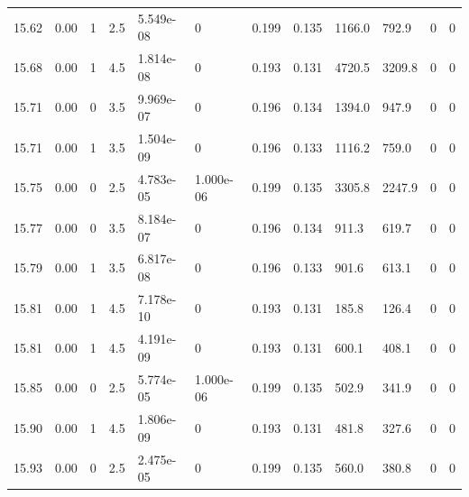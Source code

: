 \documentclass[preview]{standalone}
\begin{document}
{{{{{{{{{{{{{{{{\begin{tabular}{L{1.2cm}C{1.2cm} C{0.3cm}C{0.5cm} C{1.4cm}C{1.4cm} C{1.4cm}C{1.4cm} C{1.6cm}C{1.6cm} C{1.6cm}C{1.6cm}}
  15.62  &  0.00  & 1     & 2.5 &  5.549e-08  & 0  &  0.199&   0.135& 1166.0 & 792.9   &  0 & 0  \\ 
  15.68  &  0.00  & 1     & 4.5 &  1.814e-08  & 0  &  0.193&   0.131& 4720.5 & 3209.8   &  0 & 0  \\ 
  15.71  &  0.00  & 0     & 3.5 &  9.969e-07  & 0  &  0.196&   0.134& 1394.0 & 947.9   &  0 & 0  \\ 
  15.71  &  0.00  & 1     & 3.5 &  1.504e-09  & 0  &  0.196&   0.133& 1116.2 & 759.0   &  0 & 0  \\ 
  15.75  &  0.00  & 0     & 2.5 &  4.783e-05  & 1.000e-06  &  0.199&   0.135& 3305.8 & 2247.9   &  0 & 0  \\ 
  15.77  &  0.00  & 0     & 3.5 &  8.184e-07  & 0  &  0.196&   0.134& 911.3 & 619.7   &  0 & 0  \\ 
  15.79  &  0.00  & 1     & 3.5 &  6.817e-08  & 0  &  0.196&   0.133& 901.6 & 613.1   &  0 & 0  \\ 
  15.81  &  0.00  & 1     & 4.5 &  7.178e-10  & 0  &  0.193&   0.131& 185.8 & 126.4   &  0 & 0  \\ 
  15.81  &  0.00  & 1     & 4.5 &  4.191e-09  & 0  &  0.193&   0.131& 600.1 & 408.1   &  0 & 0  \\ 
  15.85  &  0.00  & 0     & 2.5 &  5.774e-05  & 1.000e-06  &  0.199&   0.135& 502.9 & 341.9   &  0 & 0  \\ 
  15.90  &  0.00  & 1     & 4.5 &  1.806e-09  & 0  &  0.193&   0.131& 481.8 & 327.6   &  0 & 0  \\ 
  15.93  &  0.00  & 0     & 2.5 &  2.475e-05  & 0  &  0.199&   0.135& 560.0 & 380.8   &  0 & 0  \\ 
\hline 
\end{tabular} 

}}}}}}}}}}}}}}}}
\end{document}
